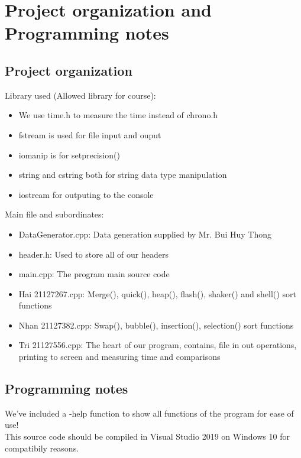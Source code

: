 \documentclass{article}
\newcommand\tab[1][0.5cm]{\hspace*{#1}}
\begin{document}
\section{Project organization and Programming notes}

\subsection{Project organization}
Library used (Allowed library for course):\\
\begin{itemize}
    \item We use time.h to measure the time instead of chrono.h
    \item fstream is used for file input and ouput
    \item iomanip is for setprecision()
    \item string and cstring both for string data type manipulation
    \item iostream for outputing to the console
\end{itemize}

Main file and subordinates:
\begin{itemize}
    \item DataGenerator.cpp: Data generation supplied by Mr. Bui Huy Thong
    \item header.h: Used to store all of our headers
    \item main.cpp: The program main source code
    \item Hai 21127267.cpp: Merge(), quick(), heap(), flash(), shaker() and shell() sort functions
    \item Nhan 21127382.cpp: Swap(), bubble(), insertion(), selection() sort functions
    \item Tri 21127556.cpp: The heart of our program, contains, file in out operations, printing to screen and measuring time and comparisons
\end{itemize}
\subsection{Programming notes}

\tab We've included a -help function to show all functions of the program for ease of use!\\
\tab This source code should be compiled in Visual Studio 2019 on Windows 10 for compatibily reasons.

\pagebreak
\end{document}
